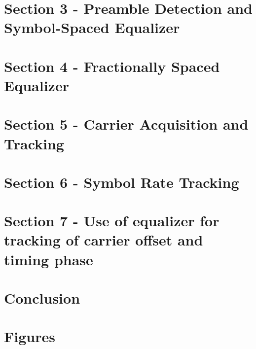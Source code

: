 \documentclass[10pt,a4paper]{report}
\begin{document}
\section{Section 3 - Preamble Detection and Symbol-Spaced Equalizer}

\vspace{-1em}
\section{Section 4 - Fractionally Spaced Equalizer}

\vspace{-1em}
\section{Section 5 - Carrier Acquisition and Tracking}

\vspace{-1em}
\section{Section 6 - Symbol Rate Tracking}

\vspace{-1em}
\section{Section 7 - Use of equalizer for tracking of carrier offset and timing phase}

\vspace{-1em}
\section{Conclusion}

\newpage
\section{Figures}

%

\newpage

\end{document}
